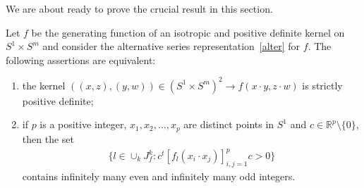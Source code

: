 We are about ready to prove the crucial result in this section.

\begin{Theorem} \label{key}
Let $f$ be the generating function of an isotropic and positive definite kernel on~\mbox{$S^1 \times S^m$} and consider the alternative series representation~\eqref{alter} for $f$. The following assertions are equivalent:
\begin{enumerate}\itemsep=0pt
\item[$(i)$] the kernel $((x,z), (y,w)) \in (S^1 \times S^m)^2 \to f(x \cdot y, z \cdot w)$ is strictly positive definite;
\item[$(ii)$] if $p$ is a positive integer, $x_1, x_2, \ldots, x_p$ are distinct points in $S^1$ and $c\in \mathbb{R}^p\setminus\{0\}$, then the set
\begin{gather*}\big\{l\in \cup_{k}J_f^k \colon c^{t} [f_l(x_i \cdot x_j)]_{i,j=1}^p c>0\big\}\end{gather*}
contains infinitely many even and infinitely many odd integers.
\end{enumerate}
\end{Theorem}
